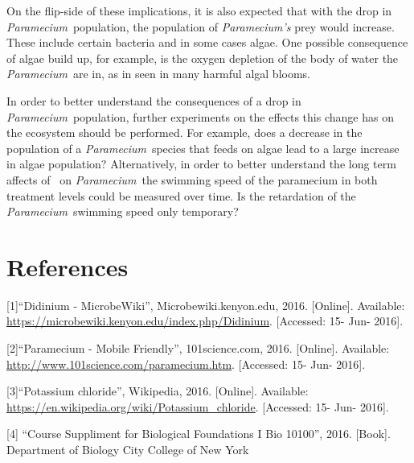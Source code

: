 \documentclass[12pt]{article}
\newcommand{\p}{\textit{Paramecium}}
\newcommand{\kcl}{\ce{KCl}}
\begin{document}
On the flip-side of these implications, it is also expected that with the drop in \p\ population, the population of \textit{Paramecium's} prey would increase. These include certain bacteria and in some
cases algae. One possible consequence of algae build up, for example, is the oxygen depletion of the body of water the \p\ are in, as in seen in many harmful algal blooms. 

In order to better understand the consequences of a drop in \p\ population, further experiments on the effects this change has on the ecosystem should be performed. For example, does a decrease
in the population of a \p\ species that feeds on algae lead to a large increase in algae population? Alternatively, in order to better understand the long term affects of \kcl\ on \p\, the 
swimming speed of the paramecium in both treatment levels could be measured over time. Is the retardation of the \p\ swimming speed only temporary?

\section{References}
[1]``Didinium - MicrobeWiki'', Microbewiki.kenyon.edu, 2016. [Online]. Available: \url{https://microbewiki.kenyon.edu/index.php/Didinium}. [Accessed: 15- Jun- 2016].

[2]``Paramecium - Mobile Friendly'', 101science.com, 2016. [Online]. Available: \url{http://www.101science.com/paramecium.htm}. [Accessed: 15- Jun- 2016].

[3]``Potassium chloride'', Wikipedia, 2016. [Online]. Available: \url{https://en.wikipedia.org/wiki/Potassium\_chloride}. [Accessed: 15- Jun- 2016].

[4] ``Course Suppliment for Biological Foundations I Bio 10100'', 2016. [Book]. Department of Biology City College of New York
\end{document}
